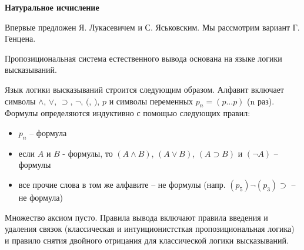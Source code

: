 \textbf{Натуральное исчисление}

Впервые предложен Я. Лукасевичем и С. Яськовским. Мы рассмотрим вариант Г. Генцена. 

Пропозициональная система естественного вывода основана на языке логики высказываний. 
  
Язык логики высказываний строится следующим образом. Алфавит включает символы $\land$, $\lor$, $\supset$, $\neg$, $($, $)$, $p$ и символы переменных $p_n = (p...p)$ (n раз). Формулы определяются индуктивно с помощью следующих правил:
\begin{itemize}
  \item $p_n$ -- формула
  \item если $A$ и $B$ - формулы, то $(A \land B)$, $(A \lor B)$, $(A \supset B)$ и $(\neg A)$ -- формулы
  \item все прочие слова в том же алфавите -- не формулы (напр. $(p_5) \neg (p_3) \supset$ -- не формула)
\end{itemize}

Множество аксиом пусто. Правила вывода включают правила введения и удаления связок (классическая и интуиционистсткая пропозициональная логика) и правило снятия двойного отрицания для классической логики высказываний. 


\begin{prooftree}
\end{prooftree}

\begin{prooftree}
\end{prooftree}

\begin{prooftree}
\end{prooftree}


\begin{prooftree}
\end{prooftree}

\begin{prooftree}
\end{prooftree}

